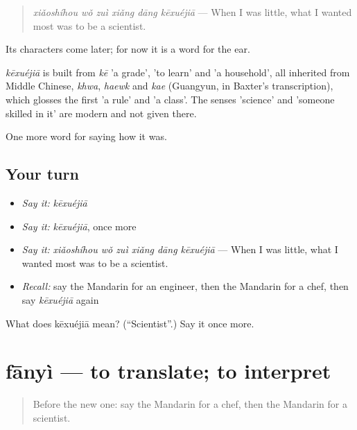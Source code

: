 \begin{quote}
\emph{xiǎoshíhou wǒ zuì xiǎng dāng kēxuéjiā} — When I was little, what I wanted most was to be a scientist.
\end{quote}

Its characters come later; for now it is a word for the ear.

\begin{cousinweb}
\emph{kēxuéjiā} is built from \emph{kē} 'a grade',  'to learn' and  'a household', all inherited from Middle Chinese, \emph{khwa}, \emph{haewk} and \emph{kae} (Guangyun, in Baxter's transcription), which glosses the first 'a rule' and 'a class'. The senses 'science' and 'someone skilled in it' are modern and not given there.
\end{cousinweb}

\begin{grammarlens}[title={What you've built}]
One more word for saying how it was.
\end{grammarlens}

\subsection*{Your turn}
\begin{itemize}
\raggedright
  \item \emph{Say it:} \emph{kēxuéjiā}
  \item \emph{Say it:} \emph{kēxuéjiā}, once more
  \item \emph{Say it:} \emph{xiǎoshíhou wǒ zuì xiǎng dāng kēxuéjiā} — When I was little, what I wanted most was to be a scientist.
  \item \emph{Recall:} say the Mandarin for an engineer, then the Mandarin for a chef, then say \emph{kēxuéjiā} again
\end{itemize}

\begin{tcolorbox}[breakable,colback=teal!4,colframe=teal!35!black,title={Before you move on}]
What does kēxuéjiā mean? (\textquotedblleft{}Scientist\textquotedblright{}.) Say it once more.
\end{tcolorbox}
\section[fānyì]{fānyì — to translate; to interpret}

\label{lesson:ZH-C488-fanyi}



\begin{quote}
Before the new one: say the Mandarin for a chef, then the Mandarin for a scientist.
\end{quote}

